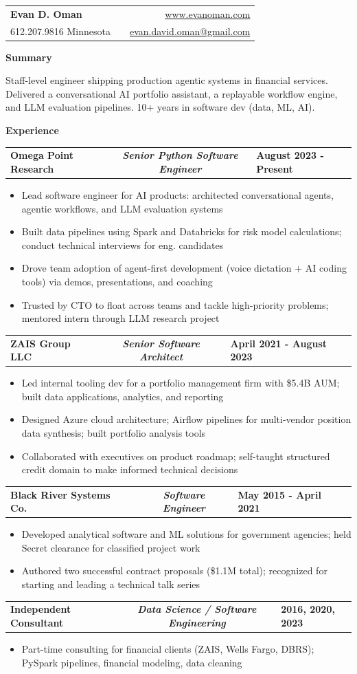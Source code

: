 \documentclass[letterpaper,10pt]{article}
\newcommand{\myitem}{\item[$\triangleright$]}
\newcommand{\resHeading}[1]{{
		\begin{tcolorbox}[size=title, sharp corners, colback=mygrey, colframe=mygrey]
			\centering\textbf{\large #1}
		\end{tcolorbox}
	}}
\newcommand{\threeColSubHeading}[3]{
		\begin{tabularx}{\textwidth}{XcX}
				\textbf{#1} & \textit{\textbf{#2}}  & \hfill\textbf{#3}
		\end{tabularx}
	}
\begin{document}
	\begin{tabularx}{\textwidth}{lXr}
		\textbf{\Large Evan D. Oman}  &  & \underline{\href{https://www.evanoman.com}{www.evanoman.com}} \\
		612.207.9816 \hfill Minnesota & & \href{mailto:evan.david.oman@gmail.com}{evan.david.oman@gmail.com}\\
	\end{tabularx}

	\resHeading{Summary}
	\noindent Staff-level engineer shipping production agentic systems in financial services. Delivered a conversational AI portfolio assistant, a replayable workflow engine, and LLM evaluation pipelines. 10+ years in software dev (data, ML, AI).

	\resHeading{Experience}
		\threeColSubHeading{Omega Point Research}{Senior Python Software Engineer}{August 2023 - Present}
		\begin{itemize}
			\myitem Lead software engineer for AI products: architected conversational agents, agentic workflows, and LLM evaluation systems
			\myitem Built data pipelines using Spark and Databricks for risk model calculations; conduct technical interviews for eng. candidates
			\myitem Drove team adoption of agent-first development (voice dictation + AI coding tools) via demos, presentations, and coaching
			\myitem Trusted by CTO to float across teams and tackle high-priority problems; mentored intern through LLM research project
		\end{itemize}
		\threeColSubHeading{ZAIS Group LLC}{Senior Software Architect}{April 2021 - August 2023}
		\begin{itemize}
			\myitem Led internal tooling dev for a portfolio management firm with \$5.4B AUM; built data applications, analytics, and reporting
			\myitem Designed Azure cloud architecture; Airflow pipelines for multi-vendor position data synthesis; built portfolio analysis tools
			\myitem Collaborated with executives on product roadmap; self-taught structured credit domain to make informed technical decisions
		\end{itemize}
		\threeColSubHeading{Black River Systems Co.}{Software Engineer}{May 2015 - April 2021}
			\begin{itemize}
				\myitem Developed analytical software and ML solutions for government agencies; held Secret clearance for classified project work
				\myitem Authored two successful contract proposals (\$1.1M total); recognized for starting and leading a technical talk series
			\end{itemize}
		\threeColSubHeading{Independent Consultant}{Data Science / Software Engineering}{2016, 2020, 2023}
			\begin{itemize}
				\myitem Part-time consulting for financial clients (ZAIS, Wells Fargo, DBRS); PySpark pipelines, financial modeling, data cleaning
			\end{itemize}
\end{document}
